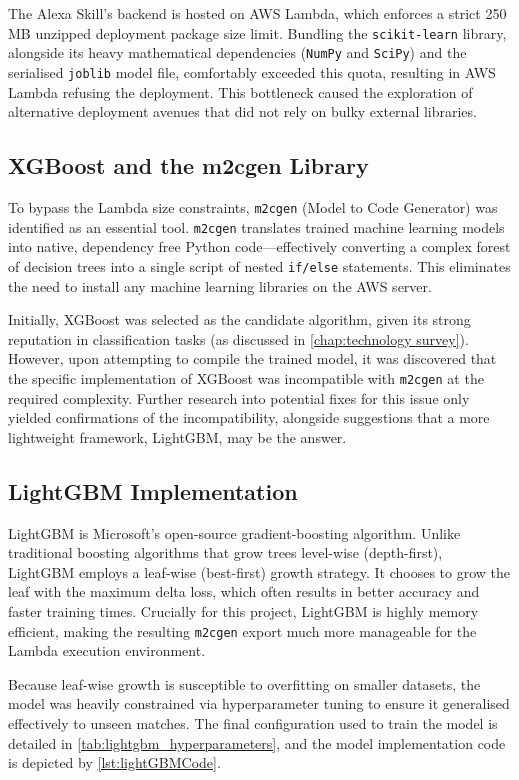 The Alexa Skill's backend is hosted on AWS Lambda, which enforces a strict 250 MB unzipped deployment package size limit. Bundling the \texttt{scikit-learn} library, alongside its heavy mathematical dependencies (\texttt{NumPy} and \texttt{SciPy}) and the serialised \texttt{joblib} model file, comfortably exceeded this quota, resulting in AWS Lambda refusing the deployment. This bottleneck caused the exploration of alternative deployment avenues that did not rely on bulky external libraries.

\subsection{XGBoost and the m2cgen Library}
To bypass the Lambda size constraints, \texttt{m2cgen} (Model to Code Generator) was identified as an essential tool. \texttt{m2cgen} translates trained machine learning models into native, dependency free Python code---effectively converting a complex forest of decision trees into a single script of nested \texttt{if/else} statements. This eliminates the need to install any machine learning libraries on the AWS server.

Initially, XGBoost was selected as the candidate algorithm, given its strong reputation in classification tasks (as discussed in \autoref{chap:technology survey}). However, upon attempting to compile the trained model, it was discovered that the specific implementation of XGBoost was incompatible with \texttt{m2cgen} at the required complexity. Further research into potential fixes for this issue only yielded confirmations of the incompatibility, alongside suggestions that a more lightweight framework, LightGBM, may be the answer.

\subsection{LightGBM Implementation}
LightGBM is Microsoft's open-source gradient-boosting algorithm. Unlike traditional boosting algorithms that grow trees level-wise (depth-first), LightGBM employs a leaf-wise (best-first) growth strategy. It chooses to grow the leaf with the maximum delta loss, which often results in better accuracy and faster training times. Crucially for this project, LightGBM is highly memory efficient, making the resulting \texttt{m2cgen} export much more manageable for the Lambda execution environment.

Because leaf-wise growth is susceptible to overfitting on smaller datasets, the model was heavily constrained via hyperparameter tuning to ensure it generalised effectively to unseen matches. The final configuration used to train the model is detailed in \autoref{tab:lightgbm_hyperparameters}, and the model implementation code is depicted by \autoref{lst:lightGBMCode}.

